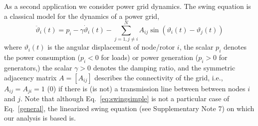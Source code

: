 \documentclass[%
 reprint,
 amsmath,amssymb,
 aip,
]{revtex4-2}
\theoremstyle{italichead}
\theoremstyle{definition}
\begin{document}
{As a second application we consider power grid dynamics. The swing equation is  a classical model for the dynamics of a power grid, \cite{nishikawa2015comparative,bhatta2021modal}
\begin{equation} \label{eq:swingsimple}
     \ddot{\vartheta}_i (t) = p_i - {\gamma} \dot{\vartheta}_i (t) - \sum_{j= 1, j \neq i}^N A_{ij} \sin(\vartheta_i (t) - \vartheta_j (t))
\end{equation}
where $\vartheta_i (t)$ is the angular displacement of node/rotor $i$, the scalar $p_i$ denotes the power consumption ($p_i <0$ for loads) or power generation ($p_i >0$ for generators,) the scalar ${\gamma >0}$ denotes the damping ratio, and the symmetric adjacency matrix $A = [A_{ij}]$ describes the connectivity of the grid, i.e.,  $A_{ij}=A_{ji}=1$ ($0$) if there is (is not) a transmission line between between nodes $i$ and $j$. 
{Note that although Eq.\ \eqref{eq:swingsimple} is not a particular case of Eq.\ \eqref{general}, the linearized swing equation (see Supplementary Note 7) on which our analysis is based is.}






}
\end{document}
